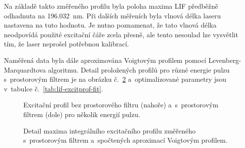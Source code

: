 Na základě takto změřeného profilu byla poloha maxima LIF předběžně
odhadnuta na \SI{196.032}{\nano\metre}.
Při dalších měřeních byla vlnová délka laseru na\-stavena na tuto hodnotu.
Je nutno poznamenat, že tato vlnová délka neodpovídá použité excitační čáře
zcela přesně, ale tento nesoulad lze vysvětlit tím,
že laser neprošel potřebnou kalibrací.

Naměřená data byla dále aproximována Voigtovým profilem pomocí
Le\-ven\-berg-Marquardtova algoritmu.
Detail proložených profilů pro různé energie pulzu s~prostorovým filtrem
je na obrázku č.~\ref{fig:lif-excitprof-fit}
a~optimalizované parametry jsou v~tabulce č.~\ref{tab:lif-excitprof-fit}.

\begin{figure}
	\centering
	
	\bigskip\par
	
	\caption{Excitační profil bez prostorového filtru (nahoře)
		a~s~prostorovým filtrem (dole) pro několik energií pulzu.}
	\label{fig:lif-excitprof-filter}
\end{figure}

\begin{figure}[p]
	\centering
	
	\caption{Detail maxima integrálního excitačního profilu
		změřeného s~prostorovým filtrem
		a~spočtených aproximací Voigtovým profilem.}
	\label{fig:lif-excitprof-fit}
\end{figure}


